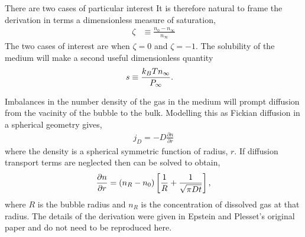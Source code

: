 There are two cases of particular interest
It is therefore natural to frame the derivation in terms a dimensionless measure of saturation,
\begin{align}
  \zeta &\equiv \frac{n_0 - n_\infty}{n_\infty }\label{eqn:nuc:saturation}
\end{align}
The two cases of interest are  when $\zeta = 0$ and $\zeta = -1$.
The solubility of the medium will make a second useful dimensionless quantity\cite{Gor2011}
\begin{align}
  s &\equiv \frac{k_B T n_\infty}{P_\infty} \label{eqn:nuc:solubility}.
\end{align}

Imbalances in the number density of the gas in the medium will prompt diffusion from the vacinity of the bubble to the bulk.
Modelling this as Fickian diffusion  in a spherical geometry gives,
\begin{align}
  j_D = -D \frac{\partial n}{\partial r}
  \label{eqn:nuc:Fickian}
\end{align}
where  the density is a spherical symmetric function of radius, $r$.
If diffusion transport terms are neglected then  can be solved to obtain,
\begin{align}
  \frac{\partial n}{\partial r} = \left( n_R - n_0 \right)\left[ \frac{1}{R} + \frac{1}{\sqrt{\pi D t}} \right],
\end{align}
where $R$ is the bubble radius and $n_R$ is the concentration of dissolved gas at that radius.
The details of the derivation were given in Epstein and Plesset's \cite{Epstein1950} original paper and do not need to be reproduced here.

